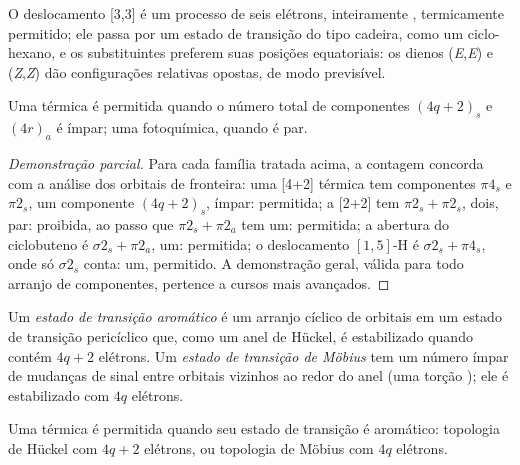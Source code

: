 O deslocamento [3,3] é um processo de seis elétrons, inteiramente , termicamente permitido;
ele passa por um estado de transição do tipo cadeira, como um ciclo-hexano, e
os substituintes preferem suas posições equatoriais: os dienos (\textit{E},\textit{E}) e (\textit{Z},\textit{Z}) dão
configurações relativas opostas, de modo previsível.

\begin{theorem}\label{thm:b3:pericyclic:woodward-hoffmann}
Uma  térmica é permitida quando o número total de componentes $(4q + 2)_s$ e
$(4r)_a$ é ímpar; uma fotoquímica, quando é par.
\end{theorem}

\begin{proof}[Demonstração parcial]
Para cada família tratada acima, a contagem concorda com a análise
dos orbitais de fronteira: uma  [4+2] térmica tem componentes $\pi4_s$ e $\pi2_s$, um componente
$(4q + 2)_s$, ímpar: permitida; a [2+2] tem $\pi2_s + \pi2_s$, dois, par: proibida, ao passo que
$\pi2_s + \pi2_a$ tem um: permitida; a abertura  do ciclobuteno é $\sigma2_s + \pi2_a$, um:
permitida; o deslocamento $[1,5]$-H  é $\sigma2_s + \pi4_s$, onde só $\sigma2_s$ conta: um,
permitido. A demonstração geral, válida para todo arranjo de componentes, pertence
a cursos mais avançados.
\end{proof}

\begin{definition}\label{def:b3:pericyclic:mobius}
Um \emph{estado de transição aromático} é um arranjo
cíclico de orbitais em um estado de transição pericíclico que, como um anel de Hückel, é
estabilizado quando contém $4q + 2$ elétrons. Um \emph{estado de transição de
Möbius} tem um número ímpar de mudanças de sinal entre
orbitais vizinhos ao redor do anel (uma torção ); ele é
estabilizado com $4q$ elétrons.
\end{definition}

\begin{proposition}\label{prop:b3:pericyclic:aromatic-ts}
Uma  térmica é permitida quando seu estado de transição é aromático:
topologia de Hückel com $4q + 2$ elétrons, ou topologia de Möbius com $4q$ elétrons.
\end{proposition}

